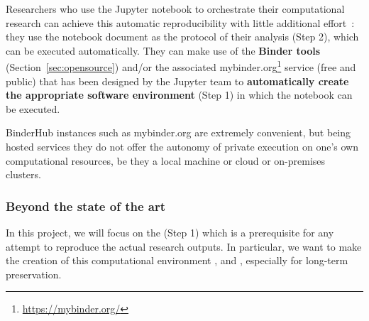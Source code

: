 \medskip Researchers who use the Jupyter notebook to orchestrate their
computational research can achieve this automatic
reproducibility with little additional effort~\cite{Beg2021}: they use the notebook document as
the protocol of their analysis (Step 2), which can be executed automatically.
They can make use of the \textbf{Binder tools} (Section~\ref{sec:opensource}) and/or the
associated  mybinder.org\footnote{\url{https://mybinder.org/}} service (free and public) that has
been designed by the Jupyter team to \textbf{automatically create the appropriate
software environment} (Step 1) in which the notebook can be executed.

BinderHub instances such as mybinder.org are extremely convenient,
but being hosted services they do not offer the autonomy
of private execution on one's own computational resources,
be they a local machine or cloud or on-premises clusters.

\subsubsection{Beyond the state of the art}

In this project, we will focus on the  (Step 1) which is a prerequisite for any attempt to
reproduce the actual research outputs. In particular, we want to make the
creation of this computational environment ,  and ,
especially for long-term preservation.

